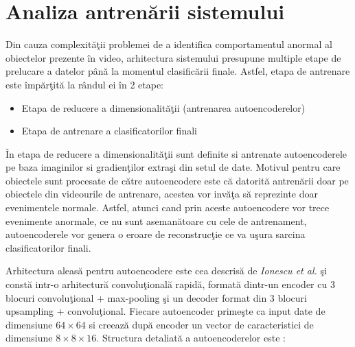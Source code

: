 \documentclass[a4paper,12pt]{report}
\begin{document}
\section{Analiza antrenării sistemului}
\quad Din cauza complexităţii problemei de a identifica comportamentul anormal al obiectelor prezente în video, arhitectura sistemului presupune multiple etape de prelucare a datelor până la momentul clasificării finale. Astfel, etapa de antrenare este împărţită la rândul ei în 2 etape:
\begin{itemize}
\item Etapa de reducere a dimensionalităţii (antrenarea autoencoderelor)
\item Etapa de antrenare a clasificatorilor finali
\end{itemize}
\par În etapa de reducere a dimensionalităţii sunt definite si antrenate autoencoderele pe baza imaginilor si gradienţilor extraşi din setul de date. Motivul pentru care obiectele sunt procesate de către autoencodere este că datorită antrenării doar pe obiectele din videourile de antrenare, acestea vor invăţa să reprezinte doar evenimentele normale. Astfel, atunci cand prin aceste autoencodere vor trece evenimente anormale, ce nu sunt asemanătoare cu cele de antrenament, autoencoderele vor genera o eroare de reconstrucţie ce va uşura sarcina clasificatorilor finali.
\par Arhitectura aleasă pentru autoencodere este cea descrisă de \emph{Ionescu et al.}  \cite{ionescu2019object} şi constă intr-o arhitectură convoluţională rapidă, formată dintr-un encoder cu 3 blocuri convoluţional + max-pooling şi un decoder format din 3 blocuri upsampling + convoluţional. Fiecare autoencoder primeşte ca input date de dimensiune \(64 \times 64\) si creează după encoder un vector de caracteristici de dimensiune \(8 \times 8 \times 16\).  Structura detaliată a autoencoderelor este : 
\end{document}
